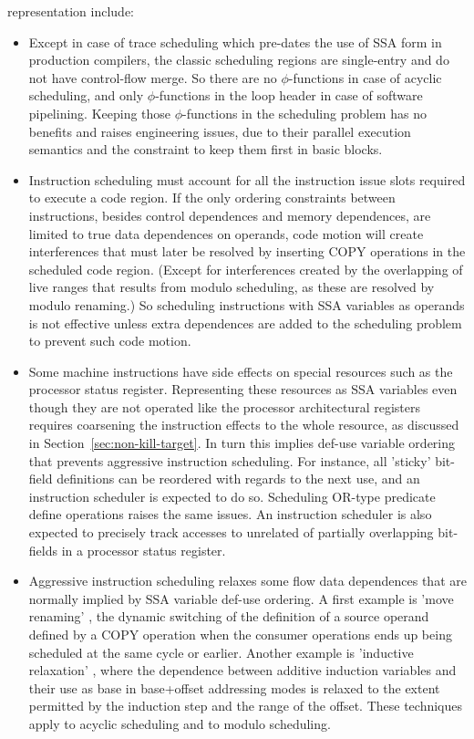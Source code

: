representation include: \begin{itemize}

\item Except in case of trace scheduling which pre-dates the use of SSA form in
production compilers, the classic scheduling regions are single-entry and do not
have control-flow merge. So there are no $\phi$-functions in case of acyclic
scheduling, and only $\phi$-functions in the loop header in case of software
pipelining. Keeping those $\phi$-functions in the scheduling problem has no
benefits and raises engineering issues, due to their parallel execution
semantics and the constraint to keep them first in basic blocks.

\item Instruction scheduling must account for all the instruction issue slots
required to execute a code region. If the only ordering constraints between
instructions, besides control dependences and memory dependences, are limited to
true data dependences on operands, code motion will create interferences that
must later be resolved by inserting COPY operations in the scheduled code
region. (Except for interferences created by the overlapping of live ranges
that results from modulo scheduling, as these are resolved by modulo renaming.)
So scheduling instructions with SSA variables as operands is not effective
unless extra dependences are added to the scheduling problem to prevent such
code motion. 

\item Some machine instructions have side effects on special resources such as
the processor status register. Representing these resources as SSA variables
even though they are not operated like the processor architectural registers
requires coarsening the instruction effects to the whole resource, as discussed
in Section~\ref{sec:non-kill-target}. In turn this implies def-use variable
ordering that prevents aggressive instruction scheduling. For instance, all
'sticky' bit-field definitions can be reordered with regards to the next use,
and an instruction scheduler is expected to do so. Scheduling OR-type predicate
define operations \cite{Schlansker_1999_PLDI} raises the same issues. An
instruction scheduler is also expected to precisely track accesses to unrelated
of partially overlapping bit-fields in a processor status register.

\item Aggressive instruction scheduling relaxes some flow data dependences that
are normally implied by SSA variable def-use ordering. A first example is 'move
renaming' \cite{Young:1998:MICRO}, the dynamic switching of the definition of a
source operand defined by a COPY operation when the consumer operations ends
up being scheduled at the same cycle or earlier. Another example is 'inductive
relaxation' \cite{Dinechin:1997:PaCT}, where the dependence between additive
induction variables and their use as base in base+offset addressing modes is
relaxed to the extent permitted by the induction step and the range of the
offset. These techniques apply to acyclic scheduling and to modulo scheduling.

\end{itemize}

